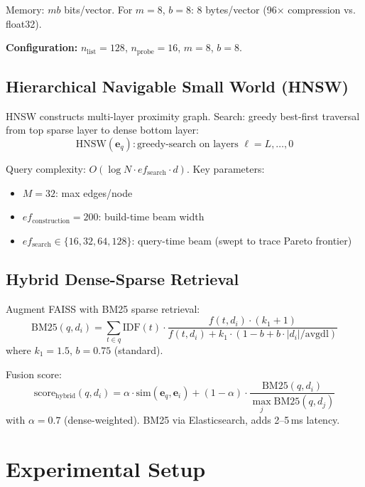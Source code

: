 \documentclass[conference]{IEEEtran}
\begin{document}
Memory: $mb$ bits/vector. For $m=8$, $b=8$: 8 bytes/vector (96$\times$ compression vs. float32).

\textbf{Configuration:} $n_{\text{list}}=128$, $n_{\text{probe}}=16$, $m=8$, $b=8$.

\subsection{Hierarchical Navigable Small World (HNSW)}

HNSW constructs multi-layer proximity graph. Search: greedy best-first traversal from top sparse layer to dense bottom layer:
\begin{equation}
\text{HNSW}(\mathbf{e}_q) : \text{greedy-search on layers } \ell = L, \ldots, 0
\end{equation}

Query complexity: $O(\log N \cdot ef_{\text{search}} \cdot d)$. Key parameters:
\begin{itemize}
    \item $M=32$: max edges/node
    \item $ef_{\text{construction}}=200$: build-time beam width
    \item $ef_{\text{search}} \in \{16, 32, 64, 128\}$: query-time beam (swept to trace Pareto frontier)
\end{itemize}

\subsection{Hybrid Dense-Sparse Retrieval}

Augment FAISS with BM25 sparse retrieval:
\begin{equation}
\text{BM25}(q, d_i) = \sum_{t \in q} \text{IDF}(t) \cdot \frac{f(t, d_i) \cdot (k_1 + 1)}{f(t, d_i) + k_1 \cdot (1 - b + b \cdot |d_i|/\text{avgdl})}
\end{equation}
where $k_1=1.5$, $b=0.75$ (standard).

Fusion score:
\begin{equation}
\text{score}_{\text{hybrid}}(q, d_i) = \alpha \cdot \text{sim}(\mathbf{e}_q, \mathbf{e}_i) + (1-\alpha) \cdot \frac{\text{BM25}(q, d_i)}{\max_j \text{BM25}(q, d_j)}
\end{equation}
with $\alpha=0.7$ (dense-weighted). BM25 via Elasticsearch, adds 2--5\,ms latency.

\section{Experimental Setup}
\end{document}
